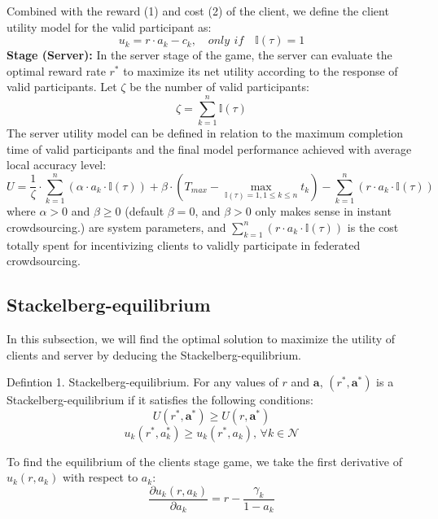 \documentclass[final,1p,times]{elsarticle}
\begin{document}
Combined with the reward (1) and cost (2) of the client, we define the client utility model for the valid participant as:
\begin{equation}
	u_k = r\cdot a_k - c_k, \quad only\,\: if\quad\mathbb{I}(\tau) = 1
\end{equation}
\textbf{Stage \uppercase\expandafter{} (Server):} In the server stage of the game, the server can evaluate the optimal reward rate $r^\ast$ to maximize its net utility according to the response of valid participants. Let $\zeta$ be the number of valid participants:
\begin{equation}
	\zeta = \sum_{k=1}^n\mathbb{I}(\tau)
\end{equation}
The server utility model can be defined in relation to the maximum completion time of valid participants and the final model performance achieved with average local accuracy level:
\begin{equation}
	U = \frac{1}{\zeta}\cdot \sum_{k=1}^n(\alpha\cdot a_k\cdot \mathbb{I}(\tau)) + \beta\cdot(T_{max}-\max_{\mathbb{I}(\tau)=1,1\le k\le n}t_k) - \sum_{k=1}^n(r\cdot a_k\cdot \mathbb{I}(\tau))
\end{equation}
where $\alpha > 0$ and $\beta \ge 0$ (default $\beta = 0$, and $\beta > 0$ only makes sense in instant crowdsourcing.) are system parameters, and $\sum_{k=1}^n(r\cdot a_k\cdot \mathbb{I}(\tau))$ is the cost totally spent for incentivizing clients to validly participate in federated crowdsourcing.
\subsection{Stackelberg-equilibrium}
In this subsection, we will find the optimal solution to maximize the utility of clients and server by deducing the Stackelberg-equilibrium. 

Defintion 1. Stackelberg-equilibrium. For any values of $r$ and $\bm{a}$, $(r^\ast,\bm{a}^\ast)$ is a Stackelberg-equilibrium if  it satisfies the following conditions:
\begin{equation}
	U(r^\ast,\bm{a}^\ast) \ge U(r,\bm{a}^\ast)
\end{equation}	
\begin{equation}
	u_k(r^\ast,a_k^\ast) \ge u_k(r^\ast,a_k),\, \forall k \in \bm{\mathcal{N}}
\end{equation}	

To find the equilibrium of the clients stage game, we take the first derivative of $u_k(r,a_k)$ with respect to $a_k$:
\begin{equation}
	\frac{\partial u_k(r,a_k)}{\partial a_k} = r-\frac{\gamma_k}{1-a_k}
\end{equation}	
\end{document}
